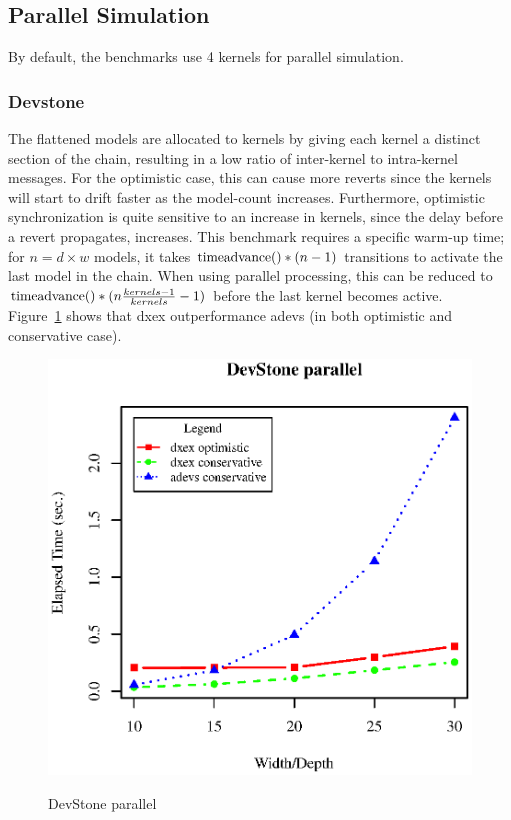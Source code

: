 \subsection{Parallel Simulation}
By default, the benchmarks use 4 kernels for parallel simulation.
\subsubsection{Devstone}
The flattened models are allocated to kernels by giving each kernel a distinct section of the chain, resulting in a low ratio of inter-kernel to intra-kernel messages. For the optimistic case, this can cause more reverts since the kernels will start to drift faster as the model-count increases. Furthermore, optimistic synchronization is quite sensitive to an increase in kernels, since the delay before a revert propagates, increases. This benchmark requires a specific warm-up time; for $n=d\times w$ models, it takes $\textup{timeadvance}()*(n-1)$ transitions to activate the last model in the chain. When using parallel processing, this can be reduced to $\textup{timeadvance}()*(n\frac{kernels-1}{kernels} -1)$ before the last kernel becomes active.\\
Figure~\ref{fig:DevstoneParallel} shows that dxex outperformance adevs (in both optimistic and conservative case).
\begin{figure}
	\includegraphics[width=.5\textwidth]{fig/fig2.eps}
	\label{fig:DevstoneParallel}
	\caption{DevStone parallel}
\end{figure}
